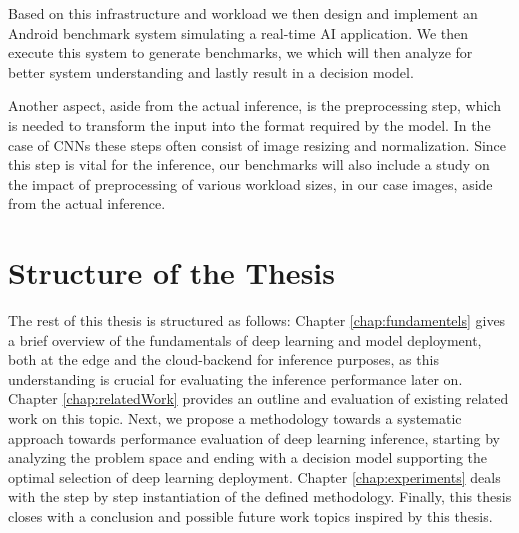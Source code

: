 Based on this infrastructure and workload we then design and implement an Android benchmark system simulating a real-time AI application.
We then execute this system to generate benchmarks, we which will then analyze for better system understanding and lastly result in a decision model.

Another aspect, aside from the actual inference, is the preprocessing step, which is needed to transform the input into the format required by the model. 
In the case of CNNs these steps often consist of image resizing and normalization.
Since this step is vital for the inference, our benchmarks will also include a study on the impact of preprocessing of various workload sizes, in our case images, aside from the actual inference.

\section{Structure of the Thesis}
The rest of this thesis is structured as follows: 
Chapter \ref{chap:fundamentels} gives a brief overview of the fundamentals of deep learning and model deployment, both at the edge and the cloud-backend for inference purposes, as this understanding is crucial for evaluating the inference performance later on.
Chapter \ref{chap:relatedWork} provides an outline and evaluation of existing related work on this topic. 
Next, we propose a methodology towards a systematic approach towards performance evaluation of deep learning inference, starting by analyzing the problem space and ending with a decision model supporting the optimal selection of deep learning deployment.
Chapter \ref{chap:experiments} deals with the step by step instantiation of the defined methodology.
Finally, this thesis closes with a conclusion and possible future work topics inspired by this thesis.
